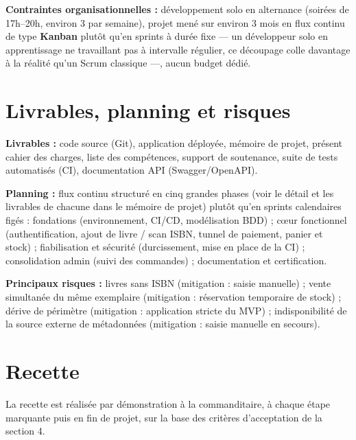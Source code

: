 \documentclass[10pt, a4paper]{article}
\begin{document}
\noindent\textbf{Contraintes organisationnelles :} développement solo en alternance
(soirées de 17h--20h, environ 3 par semaine), projet mené sur environ 3 mois en flux continu
de type \textbf{Kanban} plutôt qu'en sprints à durée fixe — un développeur solo en apprentissage
ne travaillant pas à intervalle régulier, ce découpage colle davantage à la réalité qu'un Scrum
classique —, aucun budget dédié.

\section{Livrables, planning et risques}

\noindent\textbf{Livrables :} code source (Git), application déployée, mémoire de projet,
présent cahier des charges, liste des compétences, support de soutenance, suite de tests
automatisés (CI), documentation API (Swagger/OpenAPI).

\noindent\textbf{Planning :} flux continu structuré en cinq grandes phases (voir le détail et
les livrables de chacune dans le mémoire de projet) plutôt qu'en sprints calendaires figés :
fondations (environnement, CI/CD, modélisation BDD) ; cœur fonctionnel (authentification, ajout
de livre / scan ISBN, tunnel de paiement, panier et stock) ; fiabilisation et sécurité (durcissement,
mise en place de la CI) ; consolidation admin (suivi des commandes) ; documentation et
certification.

\noindent\textbf{Principaux risques :} livres sans ISBN (mitigation : saisie manuelle) ;
vente simultanée du même exemplaire (mitigation : réservation temporaire de stock) ; dérive
de périmètre (mitigation : application stricte du MVP) ; indisponibilité de la source externe
de métadonnées (mitigation : saisie manuelle en secours).

\section{Recette}

La recette est réalisée par démonstration à la commanditaire, à chaque étape marquante puis en fin de
projet, sur la base des critères d'acceptation de la section 4.
\end{document}
